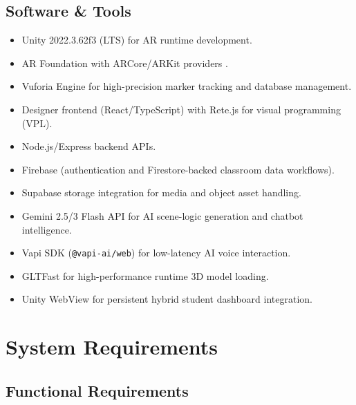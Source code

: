 \documentclass[12pt,a4paper]{article}
\begin{document}
\subsection{Software \& Tools}

\begin{itemize}[leftmargin=1.4cm]
  \item Unity 2022.3.62f3 (LTS) for AR runtime development.
  \item AR Foundation with ARCore/ARKit providers \cite{unityarfoundation}.
  \item Vuforia Engine for high-precision marker tracking and database management.
  \item Designer frontend (React/TypeScript) with Rete.js for visual programming (VPL).
  \item Node.js/Express backend APIs.
  \item Firebase (authentication and Firestore-backed classroom data workflows).
  \item Supabase storage integration for media and object asset handling.
  \item Gemini 2.5/3 Flash API for AI scene-logic generation and chatbot intelligence.
  \item Vapi SDK (\texttt{@vapi-ai/web}) for low-latency AI voice interaction.
  \item GLTFast for high-performance runtime 3D model loading.
  \item Unity WebView for persistent hybrid student dashboard integration.
\end{itemize}

\section{System Requirements}

\subsection{Functional Requirements}
\end{document}
